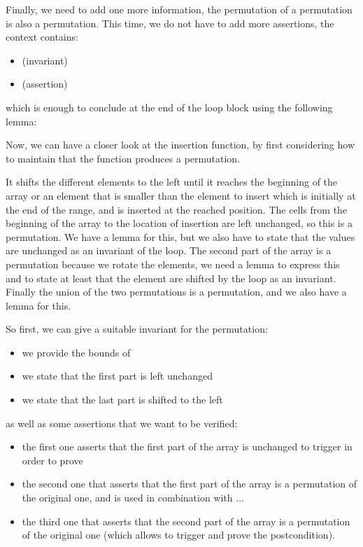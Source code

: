 Finally, we need to add one more information, the permutation of a permutation
is also a permutation. This time, we do not have to add more assertions, the
context contains:
\begin{itemize}
\item {} (invariant)
\item {} (assertion)
\end{itemize}
which is enough to conclude 
at the end of the loop block using the following lemma:






Now, we can have a closer look at the insertion function, by first considering
how to maintain that the function produces a permutation.




It shifts the different elements to the left until it reaches the beginning of
the array or an element that is smaller than the element to insert which is
initially at the end of the range, and is inserted at the reached position. The
cells from the beginning of the array to the location of insertion are left
unchanged, so this is a permutation. We have a lemma for this, but we also have
to state that the values are unchanged as an invariant of the loop. The second
part of the array is a permutation because we rotate the elements, we need a
lemma to express this and to state at least that the element are shifted by the
loop as an invariant. Finally the union of the two permutations is a
permutation, and we also have a lemma for this.



So first, we can give a suitable invariant for the permutation:

\begin{itemize}
\item we provide the bounds of 
\item we state that the first part is left unchanged
\item we state that the last part is shifted to the left
\end{itemize}

as well as some assertions that we want to be verified:
\begin{itemize}
\item the first one asserts that the first part of the array is unchanged to
  trigger  in order to prove
\item the second one that asserts that the first part of the array is a
  permutation of the original one, and is used in combination  with ...
\item the third one that asserts that the second part of the array is a
  permutation of the original one (which allows to trigger
   and prove the postcondition).
\end{itemize}


